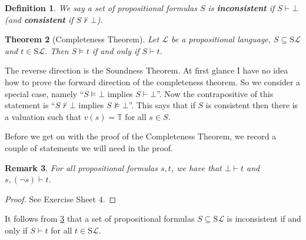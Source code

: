 \documentclass[11pt]{article}
\newcommand{\PF}{\mathrm{S}}
\newcommand{\proves}{\vdash}
\newtheorem{theorem}{Theorem}[section]
\newtheorem{remark}[theorem]{Remark}
\newtheorem{definition}[theorem]{Definition}
\newcommand{\mcal}[1]{\mathcal{#1}}
\newcommand{\T}{\mathbb{T}}
\begin{document}



\begin{definition}
We say a set of propositional formulas $S$ is \textbf{inconsistent} if $S\proves \bot$ (and \textbf{consistent} if $S\not\vdash \bot$).
\end{definition}


\begin{theorem}[Completeness Theorem]
Let $\mcal{L}$ be a propositional language, $S\subseteq \PF\mcal{L}$ and $t\in\PF\mcal{L}$. Then $S\models t$ if and only if $S\proves t$.
\end{theorem}


The reverse direction is the Soundness Theorem. At first glance I have no idea how to prove the forward direction of the completeness theorem. So we consider a special case, namely ``$S\models\bot$ implies $S\vdash \bot$''. Now the contrapositive of this statement is ``$S\not\vdash \bot$ implies $S\not\models\bot$''. This says that if $S$ is consistent then there is a valuation such that $v(s)=\T$ for all $s\in S$.

Before we get on with the proof of the Completeness Theorem, we record a couple of statements we will need in the proof.

\begin{remark}\label{Falseproveseverything}
For all propositional formulas $s,t$, we have that $\bot \proves t$ and $s,(\neg s)\proves t$.
\end{remark}
\begin{proof}
See Exercise Sheet $4$.
\end{proof}


It follows from \ref{Falseproveseverything} that a set of propositional formulas $S\subseteq \PF\mcal{L}$ is inconsistent if and only if $S\proves t$ for all $t\in \PF\mcal{L}$.
\end{document}
